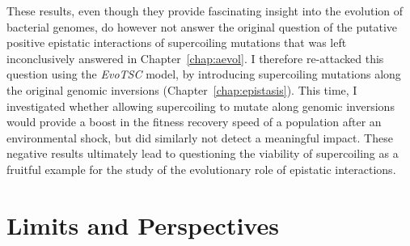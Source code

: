 These results, even though they provide fascinating insight into the evolution of bacterial genomes, do however not answer the original question of the putative positive epistatic interactions of supercoiling mutations that was left inconclusively answered in Chapter~\ref{chap:aevol}.
I therefore re-attacked this question using the \emph{EvoTSC} model, by introducing supercoiling mutations along the original genomic inversions (Chapter~\ref{chap:epistasis}).
This time, I investigated whether allowing supercoiling to mutate along genomic inversions would provide a boost in the fitness recovery speed of a population after an environmental shock, but did similarly not detect a meaningful impact.
These negative results ultimately lead to questioning the viability of supercoiling as a fruitful example for the study of the evolutionary role of epistatic interactions.

\section{Limits and Perspectives}

